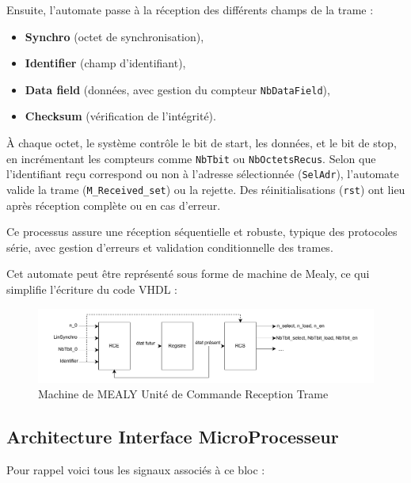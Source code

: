 Ensuite, l’automate passe à la réception des différents champs de la trame :
\begin{itemize}
    \item \textbf{Synchro} (octet de synchronisation),
    \item \textbf{Identifier} (champ d’identifiant),
    \item \textbf{Data field} (données, avec gestion du compteur \texttt{NbDataField}),
    \item \textbf{Checksum} (vérification de l’intégrité).
\end{itemize}

À chaque octet, le système contrôle le bit de start, les données, et le bit de stop, en incrémentant les compteurs comme \texttt{NbTbit} ou \texttt{NbOctetsRecus}. Selon que l’identifiant reçu correspond ou non à l’adresse sélectionnée (\texttt{SelAdr}), l’automate valide la trame (\texttt{M\_Received\_set}) ou la rejette. Des réinitialisations (\texttt{rst}) ont lieu après réception complète ou en cas d’erreur.

Ce processus assure une réception séquentielle et robuste, typique des protocoles série, avec gestion d’erreurs et validation conditionnelle des trames.

Cet automate peut être représenté sous forme de machine de Mealy, ce qui simplifie l’écriture du code VHDL : 

\begin{figure}[H]
    \centering
    \includegraphics[width=0.8\linewidth]{images/inter/MEALY_Reception_trame.pdf}
    \caption{Machine de MEALY Unité de Commande Reception Trame}
    \label{fig:placeholder}
\end{figure}

\subsection{Architecture Interface MicroProcesseur}

Pour rappel voici tous les signaux associés à ce bloc : 
\newline

